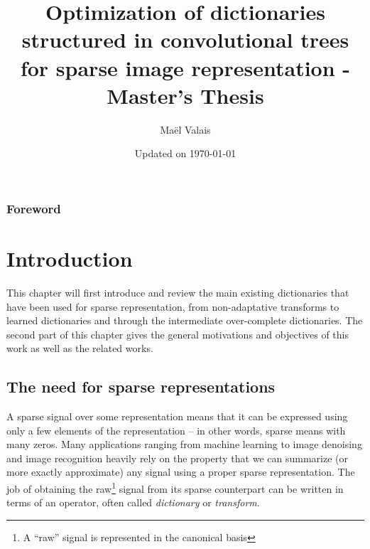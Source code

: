 \author{Maël Valais}
\date{Updated on \today}
\title{Optimization of dictionaries structured in convolutional trees for sparse image representation - Master’s Thesis}

\pagestyle{empty} \restoregeometry
\pagestyle{body}
{\let\clearpage\relax \abstract{}} 
{\let\clearpage\relax \centering \subsection*{Foreword}} 
\tableofcontents



\chapter{Introduction} %

This chapter will first introduce and review the main existing dictionaries that have been used for sparse representation, from non-adaptative transforms to learned dictionaries and through the intermediate over-complete dictionaries. The second part of this chapter gives the general motivations and objectives of this work as well as the related works.

\section{The need for sparse representations}

A sparse signal over some representation means that it can be expressed using only a few elements of the representation – in other words, sparse means with many zeros. Many applications ranging from machine learning to image denoising and image recognition heavily rely on the property that we can summarize (or more exactly approximate) any signal using a proper sparse representation. The job of obtaining the raw\footnote{A “raw” signal is represented in the canonical basis} signal from its sparse counterpart can be written in terms of an operator, often called \emph{dictionary} or \emph{transform}.


